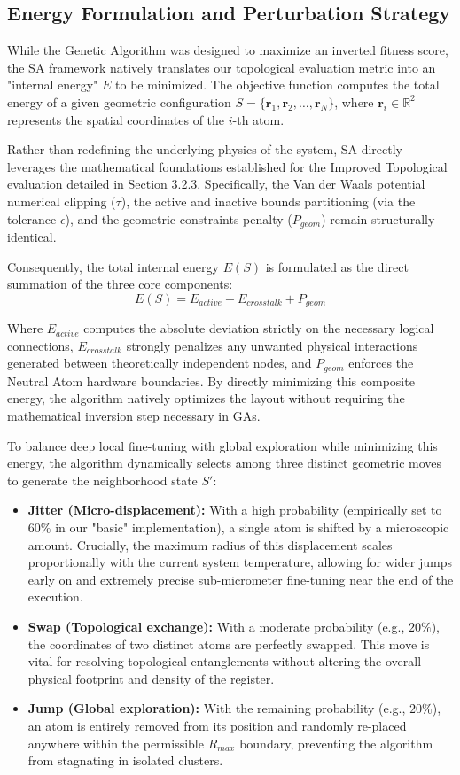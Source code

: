 \subsection{Energy Formulation and Perturbation Strategy}

While the Genetic Algorithm was designed to maximize an inverted fitness score, the SA framework natively translates our topological evaluation metric into an "internal energy" $E$ to be minimized. The objective function computes the total energy of a given geometric configuration $S = \{\mathbf{r}_1, \mathbf{r}_2, \dots, \mathbf{r}_N\}$, where $\mathbf{r}_i \in \mathbb{R}^2$ represents the spatial coordinates of the $i$-th atom.

Rather than redefining the underlying physics of the system, SA directly leverages the mathematical foundations established for the Improved Topological evaluation detailed in Section 3.2.3. Specifically, the Van der Waals potential numerical clipping ($\tau$), the active and inactive bounds partitioning (via the tolerance $\epsilon$), and the geometric constraints penalty ($P_{geom}$) remain structurally identical. 

Consequently, the total internal energy $E(S)$ is formulated as the direct summation of the three core components:
$$ E(S) = E_{active} + E_{crosstalk} + P_{geom} $$

Where $E_{active}$ computes the absolute deviation strictly on the necessary logical connections, $E_{crosstalk}$ strongly penalizes any unwanted physical interactions generated between theoretically independent nodes, and $P_{geom}$ enforces the Neutral Atom hardware boundaries. By directly minimizing this composite energy, the algorithm natively optimizes the layout without requiring the mathematical inversion step necessary in GAs.

To balance deep local fine-tuning with global exploration while minimizing this energy, the algorithm dynamically selects among three distinct geometric moves to generate the neighborhood state $S'$:
\begin{itemize}
    \item \textbf{Jitter (Micro-displacement):} With a high probability (empirically set to $60\%$ in our "basic" implementation), a single atom is shifted by a microscopic amount. Crucially, the maximum radius of this displacement scales proportionally with the current system temperature, allowing for wider jumps early on and extremely precise sub-micrometer fine-tuning near the end of the execution.
    \item \textbf{Swap (Topological exchange):} With a moderate probability (e.g., $20\%$), the coordinates of two distinct atoms are perfectly swapped. This move is vital for resolving topological entanglements without altering the overall physical footprint and density of the register.
    \item \textbf{Jump (Global exploration):} With the remaining probability (e.g., $20\%$), an atom is entirely removed from its position and randomly re-placed anywhere within the permissible $R_{max}$ boundary, preventing the algorithm from stagnating in isolated clusters.
\end{itemize}

